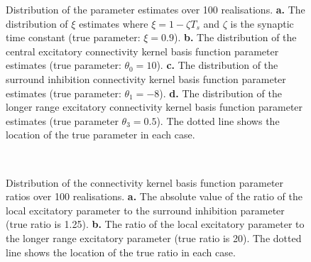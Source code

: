 \documentclass[10pt,a4paper]{article}
\begin{document}
\begin{figure}
\caption{Distribution of the parameter estimates over 100
realisations. \textbf{a.} The distribution of $\xi$ estimates where $\xi=1-\zeta T_s $ and $\zeta$ is the synaptic time constant (true parameter: $\xi=0.9$). \textbf{b.} The distribution of the central excitatory connectivity kernel basis function parameter estimates (true parameter: $\theta_0 = 10$). \textbf{c.} The distribution of the surround inhibition connectivity kernel basis function parameter estimates (true parameter: $\theta_1 = -8$). \textbf{d.} The distribution of the longer range excitatory connectivity kernel basis function parameter estimates (true parameter $\theta_3 = 0.5$). The dotted line shows the location of the true parameter in each case.}
\label{fig:Parameters}
\end{figure}
\begin{figure}
    \centering
{}
\\
\caption{Distribution of the connectivity kernel basis function parameter ratios over 100 realisations. \textbf{a.} The absolute value of the ratio of the local excitatory parameter to the surround inhibition parameter (true ratio is 1.25). \textbf{b.} The ratio of the local excitatory parameter to the longer range excitatory parameter (true ratio is 20). The dotted line shows the location of the true ratio in each case.}
\label{fig:ParametersRatio}
\end{figure}
\end{document}
